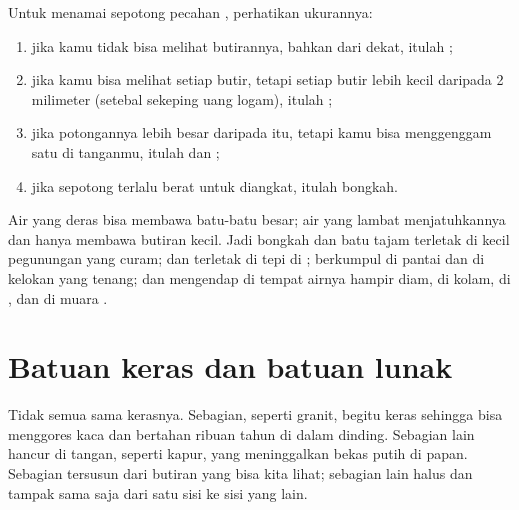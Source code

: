 \begin{method}\label{met:g3:stones-pebbles-sand:sort}
Untuk menamai sepotong pecahan , perhatikan ukurannya:
\begin{enumerate}
  \item jika kamu tidak bisa melihat butirannya, bahkan dari dekat, itulah
        ;
  \item jika kamu bisa melihat setiap butir, tetapi setiap butir lebih kecil
        daripada 2 milimeter (setebal sekeping uang logam), itulah ;
  \item jika potongannya lebih besar daripada itu, tetapi kamu bisa
        menggenggam satu di tanganmu, itulah  dan ;
  \item jika sepotong terlalu berat untuk diangkat, itulah bongkah.
\end{enumerate}
\end{method}

\begin{example}\label{ex:g3:stones-pebbles-sand:where}
Air yang deras bisa membawa batu-batu besar; air yang lambat menjatuhkannya
dan hanya membawa butiran kecil. Jadi bongkah dan batu tajam terletak di
 kecil pegunungan yang curam;  dan  terletak di
tepi  di ;  berkumpul di pantai dan di kelokan  yang
tenang; dan  mengendap di tempat airnya hampir diam, di kolam, di
, dan di muara .
\end{example}

\section{Batuan keras dan batuan lunak}

Tidak semua  sama kerasnya. Sebagian, seperti granit, begitu keras
sehingga bisa menggores kaca dan bertahan ribuan tahun di dalam dinding.
Sebagian lain hancur di tangan, seperti kapur, yang meninggalkan bekas putih
di papan. Sebagian  tersusun dari butiran yang bisa kita lihat;
sebagian lain halus dan tampak sama saja dari satu sisi ke sisi yang lain.

